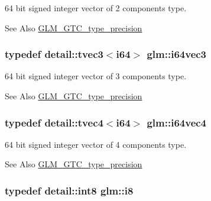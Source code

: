 64 bit signed integer vector of 2 components type. 

\begin{DoxySeeAlso}{See Also}
\hyperlink{group__gtc__type__precision}{G\-L\-M\-\_\-\-G\-T\-C\-\_\-type\-\_\-precision} 
\end{DoxySeeAlso}
\hypertarget{group__gtc__type__precision_gaefca6f789bc2d5150fe594a9aa687840}{
\subsubsection[{i64vec3}]{\setlength{\rightskip}{0pt plus 5cm}typedef detail\-::tvec3$<$i64$>$ {\bf glm\-::i64vec3}}}\label{group__gtc__type__precision_gaefca6f789bc2d5150fe594a9aa687840}


64 bit signed integer vector of 3 components type. 

\begin{DoxySeeAlso}{See Also}
\hyperlink{group__gtc__type__precision}{G\-L\-M\-\_\-\-G\-T\-C\-\_\-type\-\_\-precision} 
\end{DoxySeeAlso}
\hypertarget{group__gtc__type__precision_ga3f5fbc11fb153fa47a858e25ccf1ad27}{
\subsubsection[{i64vec4}]{\setlength{\rightskip}{0pt plus 5cm}typedef detail\-::tvec4$<$i64$>$ {\bf glm\-::i64vec4}}}\label{group__gtc__type__precision_ga3f5fbc11fb153fa47a858e25ccf1ad27}


64 bit signed integer vector of 4 components type. 

\begin{DoxySeeAlso}{See Also}
\hyperlink{group__gtc__type__precision}{G\-L\-M\-\_\-\-G\-T\-C\-\_\-type\-\_\-precision} 
\end{DoxySeeAlso}
\hypertarget{group__gtc__type__precision_gaae064be68b7d36cd7910c16e8ad18bba}{
\subsubsection[{i8}]{\setlength{\rightskip}{0pt plus 5cm}typedef detail\-::int8 {\bf glm\-::i8}}}\label{group__gtc__type__precision_gaae064be68b7d36cd7910c16e8ad18bba}


